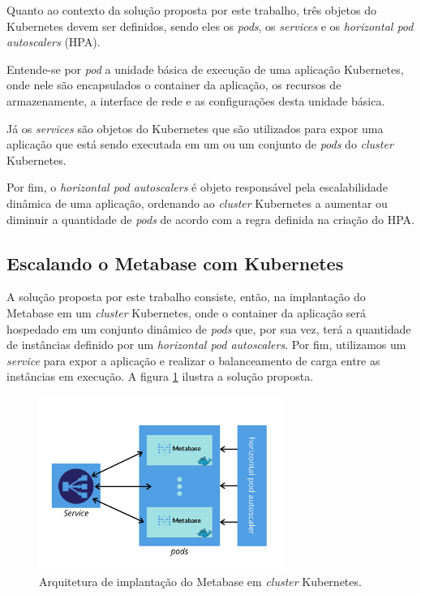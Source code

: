Quanto ao contexto da solução proposta por este trabalho, três objetos do Kubernetes devem ser definidos, sendo eles os \textit{pods}, os \textit{services} e os \textit{horizontal pod autoscalers} (HPA). 

Entende-se por \textit{pod} a unidade básica de execução de uma aplicação Kubernetes, onde nele são encapsulados o container da aplicação, os recursos de armazenamente, a interface de rede e as configurações desta unidade básica. 

Já os \textit{services} são objetos do Kubernetes que são utilizados para expor uma aplicação que está sendo executada em um ou um conjunto de \textit{pods} do \textit{cluster} Kubernetes.

Por fim, o \textit{horizontal pod autoscalers} é objeto responsável pela escalabilidade dinâmica de uma aplicação, ordenando ao \textit{cluster} Kubernetes a aumentar ou diminuir a quantidade de \textit{pods} de acordo com a regra definida na criação do HPA.

\subsection{Escalando o Metabase com Kubernetes}

A solução proposta por este trabalho consiste, então, na implantação do Metabase em um \textit{cluster} Kubernetes, onde o container da aplicação será hospedado em um conjunto dinâmico de \textit{pods} que, por sua vez, terá a quantidade de instâncias definido por um \textit{horizontal pod autoscalers}. Por fim, utilizamos um \textit{service} para expor a aplicação e realizar o balanceamento de carga entre as instâncias em execução. A figura \ref{fig.metabase-k8s} ilustra a solução proposta.

\begin{figure}[htp]
   \centering
    \includegraphics[width=8cm]{Imagens/Metabase-on-k8s}
    \caption{Arquitetura de implantação do Metabase em \textit{cluster} Kubernetes.}
    \label{fig.metabase-k8s}
\end{figure} 


